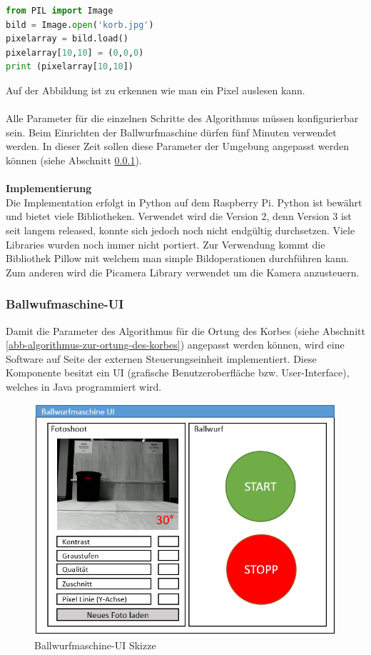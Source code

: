 \begin{lstlisting}[language=Python]
from PIL import Image
bild = Image.open('korb.jpg')
pixelarray = bild.load()
pixelarray[10,10] = (0,0,0)
print (pixelarray[10,10])
\end{lstlisting}

Auf der Abbildung ist zu erkennen wie man ein Pixel auslesen kann.\\
\\
Alle Parameter für die einzelnen Schritte des Algorithmus müssen konfigurierbar sein. Beim Einrichten der Ballwurfmaschine dürfen fünf Minuten verwendet werden. In dieser Zeit sollen diese Parameter der Umgebung angepasst werden können (siehe Abschnitt \ref{ss-config-paramater-ortung-orb}).\\
\\
\textbf{Implementierung}\\
Die Implementation erfolgt in Python auf dem Raspberry Pi. Python ist bewährt und bietet viele Bibliotheken. Verwendet wird die Version 2, denn Version 3 ist seit langem released, konnte sich jedoch noch nicht endgültig durchsetzen. Viele Libraries wurden noch immer nicht portiert. Zur Verwendung kommt die Bibliothek Pillow mit welchem man simple Bildoperationen durchführen kann. Zum anderen wird die Picamera Library verwendet um die Kamera anzusteuern.

\subsubsection{Ballwufmaschine-UI}
\label{ss-config-paramater-ortung-orb}
Damit die Parameter des Algorithmus für die Ortung des Korbes (siehe Abschnitt \ref{abb-algorithmus-zur-ortung-des-korbes}) angepasst werden können, wird eine Software auf Seite der externen Steuerungseinheit implementiert. Diese Komponente besitzt ein UI (grafische Benutzeroberfläche bzw. User-Interface), welches in Java programmiert wird.

\begin{figure}[h!]
	\centering
	\includegraphics[scale=0.75]{../../fig/fotoshoot-configurator.png}
	\caption{Ballwurfmaschine-UI Skizze}
\end{figure}

